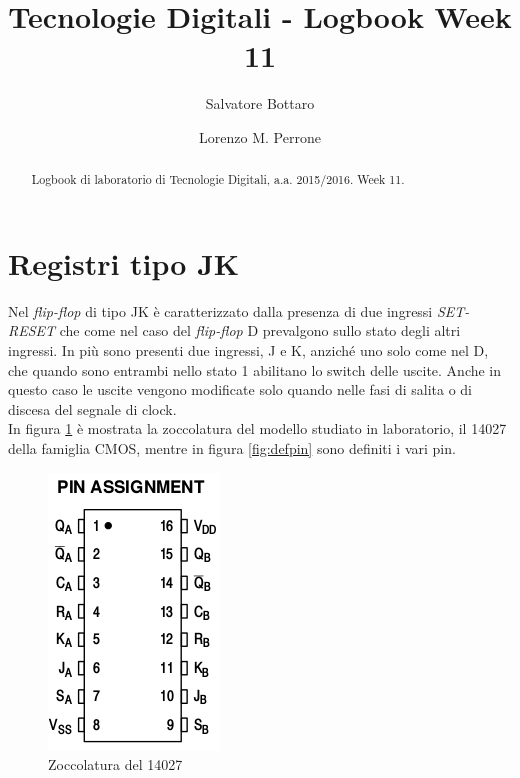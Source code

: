 \documentclass[journal, a4paper]{IEEEtran}
\begin{document}
	\title{Tecnologie Digitali - Logbook Week 11}
	\author[1]{Salvatore Bottaro}
		\author[2]{Lorenzo M. Perrone}
	\maketitle
	
\begin{abstract}
	Logbook di laboratorio di Tecnologie Digitali, a.a. 2015/2016. Week 11.
\end{abstract}

\section{Registri tipo JK}

Nel \emph{flip-flop} di tipo JK è caratterizzato dalla presenza di due ingressi \emph{SET-RESET} che come nel caso del \emph{flip-flop} D prevalgono sullo stato degli altri ingressi. In più sono presenti due ingressi, J e K, anziché uno solo come nel D, che quando sono entrambi nello stato 1 abilitano lo switch delle uscite. Anche in questo caso le uscite vengono modificate solo quando nelle fasi di salita o di discesa del segnale di clock.\\
In figura \ref{fig:pin} è mostrata la zoccolatura del modello studiato in laboratorio, il 14027 della famiglia CMOS, mentre in figura \ref{fig:defpin} sono definiti i vari pin. 

\begin{figure}[htp]
\centering
\includegraphics[scale=.4]{pin}
\caption{Zoccolatura del 14027}
\label{fig:pin}
\end{figure}
\end{document}
